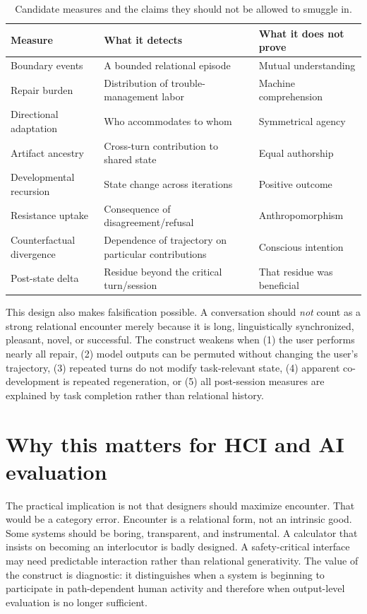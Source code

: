 \documentclass[11pt]{article}
\begin{document}
\begin{table}[ht]
\centering
\small
\begin{tabularx}{\textwidth}{@{}p{}X X@{}}
\toprule
\textbf{Measure} & \textbf{What it detects} & \textbf{What it does not prove} \\
\midrule
Boundary events & A bounded relational episode & Mutual understanding \\
Repair burden & Distribution of trouble-management labor & Machine comprehension \\
Directional adaptation & Who accommodates to whom & Symmetrical agency \\
Artifact ancestry & Cross-turn contribution to shared state & Equal authorship \\
Developmental recursion & State change across iterations & Positive outcome \\
Resistance uptake & Consequence of disagreement/refusal & Anthropomorphism \\
Counterfactual divergence & Dependence of trajectory on particular contributions & Conscious intention \\
Post-state delta & Residue beyond the critical turn/session & That residue was beneficial \\
\bottomrule
\end{tabularx}
\caption{Candidate measures and the claims they should not be allowed to smuggle in.}
\end{table}

This design also makes falsification possible. A conversation should \emph{not} count as a strong relational encounter merely because it is long, linguistically synchronized, pleasant, novel, or successful. The construct weakens when (1) the user performs nearly all repair, (2) model outputs can be permuted without changing the user's trajectory, (3) repeated turns do not modify task-relevant state, (4) apparent co-development is repeated regeneration, or (5) all post-session measures are explained by task completion rather than relational history.

\section{Why this matters for HCI and AI evaluation}

The practical implication is not that designers should maximize encounter. That would be a category error. Encounter is a relational form, not an intrinsic good. Some systems should be boring, transparent, and instrumental. A calculator that insists on becoming an interlocutor is badly designed. A safety-critical interface may need predictable interaction rather than relational generativity. The value of the construct is diagnostic: it distinguishes when a system is beginning to participate in path-dependent human activity and therefore when output-level evaluation is no longer sufficient.
\end{document}
